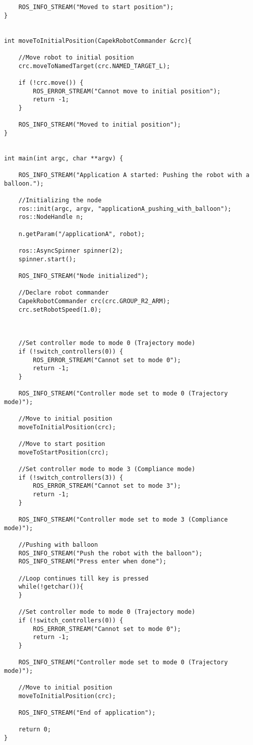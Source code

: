 \begin{lstlisting}
	ROS_INFO_STREAM("Moved to start position");
}


int moveToInitialPosition(CapekRobotCommander &crc){

	//Move robot to initial position
	crc.moveToNamedTarget(crc.NAMED_TARGET_L);

	if (!crc.move()) {
		ROS_ERROR_STREAM("Cannot move to initial position");
		return -1;
	}

	ROS_INFO_STREAM("Moved to initial position");
}


int main(int argc, char **argv) {

	ROS_INFO_STREAM("Application A started: Pushing the robot with a balloon.");

	//Initializing the node
	ros::init(argc, argv, "applicationA_pushing_with_balloon");
	ros::NodeHandle n;

	n.getParam("/applicationA", robot);

	ros::AsyncSpinner spinner(2);
	spinner.start();

	ROS_INFO_STREAM("Node initialized");

	//Declare robot commander
	CapekRobotCommander crc(crc.GROUP_R2_ARM);
	crc.setRobotSpeed(1.0);



	//Set controller mode to mode 0 (Trajectory mode)
	if (!switch_controllers(0)) {
		ROS_ERROR_STREAM("Cannot set to mode 0");
		return -1;
	}

	ROS_INFO_STREAM("Controller mode set to mode 0 (Trajectory mode)");

	//Move to initial position
	moveToInitialPosition(crc);

	//Move to start position
	moveToStartPosition(crc);

	//Set controller mode to mode 3 (Compliance mode)
	if (!switch_controllers(3)) {
		ROS_ERROR_STREAM("Cannot set to mode 3");
		return -1;
	}

	ROS_INFO_STREAM("Controller mode set to mode 3 (Compliance mode)");

	//Pushing with balloon
	ROS_INFO_STREAM("Push the robot with the balloon");
	ROS_INFO_STREAM("Press enter when done");

	//Loop continues till key is pressed
	while(!getchar()){
	}

	//Set controller mode to mode 0 (Trajectory mode)
	if (!switch_controllers(0)) {
		ROS_ERROR_STREAM("Cannot set to mode 0");
		return -1;
	}

	ROS_INFO_STREAM("Controller mode set to mode 0 (Trajectory mode)");

	//Move to initial position
	moveToInitialPosition(crc);

	ROS_INFO_STREAM("End of application");

	return 0;
}
\end{lstlisting}
